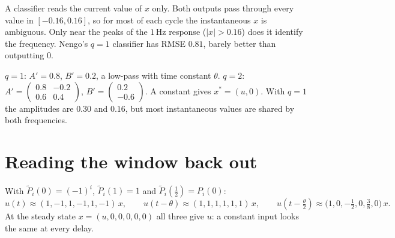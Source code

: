 \documentclass[11pt,letterpaper]{article}
\newcommand{\ans}[1]{\par\vspace{4pt}{\bfseries #1}\quad}
\begin{document}
A classifier reads the current value of $x$ only. Both outputs pass through every value in $[-0.16, 0.16]$, so for most of each cycle the instantaneous $x$ is ambiguous. Only near the peaks of the $1\,\mathrm{Hz}$ response ($|x| > 0.16$) does it identify the frequency. Nengo's $q = 1$ classifier has RMSE $0.81$, barely better than outputting $0$.
\begin{center}
\end{center}
\begin{result}
$q = 1$: $A' = 0.8$, $B' = 0.2$, a low-pass with time constant $\theta$. $q = 2$: $A' = \begin{pmatrix} 0.8 & -0.2\\ 0.6 & 0.4\end{pmatrix}$, $B' = \begin{pmatrix} 0.2 \\ -0.6 \end{pmatrix}$. A constant gives $x^* = (u, 0)$. With $q = 1$ the amplitudes are $0.30$ and $0.16$, but most instantaneous values are shared by both frequencies.
\end{result}

\section{Reading the window back out}

\ans{Q1}
With $\tilde P_i(0) = (-1)^i$, $\tilde P_i(1) = 1$ and $\tilde P_i(\tfrac12) = P_i(0)$:
\[
u(t) \approx (1, -1, 1, -1, 1, -1)\,x, \qquad u(t - \theta) \approx (1, 1, 1, 1, 1, 1)\,x, \qquad u(t - \tfrac\theta2) \approx \bigl(1, 0, -\tfrac12, 0, \tfrac38, 0\bigr)\,x.
\]
At the steady state $x = (u, 0, 0, 0, 0, 0)$ all three give $u$: a constant input looks the same at every delay.
\end{document}
